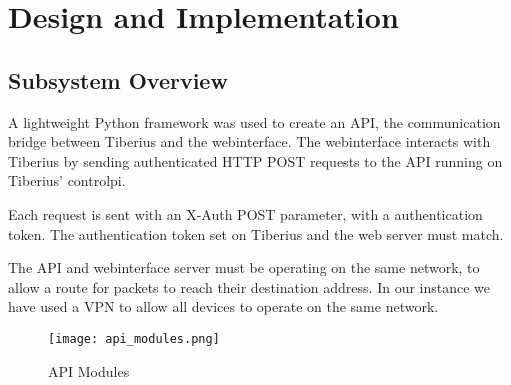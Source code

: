 \section{Design and Implementation}

\subsection{Subsystem Overview}
A lightweight Python framework was used to create an API, the communication bridge between Tiberius and the \gls{webinterface}. The \gls{webinterface} interacts with Tiberius by sending authenticated \gls{HTTP} \gls{POST} requests to the \gls{API} running on Tiberius' \gls{controlpi}.

Each request is sent with an X-Auth \gls{POST} parameter, with a authentication token. The authentication token set on Tiberius and the web server must match.

The \gls{API} and \gls{webinterface} server must be operating on the same network, to allow a route for packets to reach their destination address. In our instance we have used a \gls{VPN} to allow all devices to operate on the same network.

\begin{figure}[!htb]
\begin{center}
\texttt{[image: api\_modules.png]}
\end{center}
\caption{API Modules}
\label{fig:api-modules}
\end{figure}


